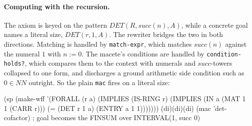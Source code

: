 \paragraph{Computing with the recursion.}
The axiom is keyed on the pattern
$\mathit{DET}(R, \mathit{succ}(n), A)$, while a concrete goal names a
literal size, $\mathit{DET}(r, 1, A)$.  The rewriter bridges the two in
both directions.  Matching is handled by \texttt{match-expr}, which
matches $\mathit{succ}(n)$ against the numeral $1$ with $n := 0$.  The
macete's conditions are handled by \texttt{condition-holds?}, which
compares them to the context with numerals and $\mathit{succ}$-towers
collapsed to one form, and discharges a ground arithmetic side condition
such as $0 \in \mathit{NN}$ outright.  So the plain \texttt{mac} fires
on a literal size:

\begin{VNBcode}
(sp (make-wff '(FORALL (r a)
     (IMPLIES (IS-RING r)
       (IMPLIES (IN a (MAT 1 1 (CARR r)))
         (= (DET r 1 a) (ENTRY a 1 1)))))))
(di)(di)(di)
(mac 'det-cofactor)   ; goal becomes the FINSUM over INTERVAL(1, succ 0)
\end{VNBcode}
